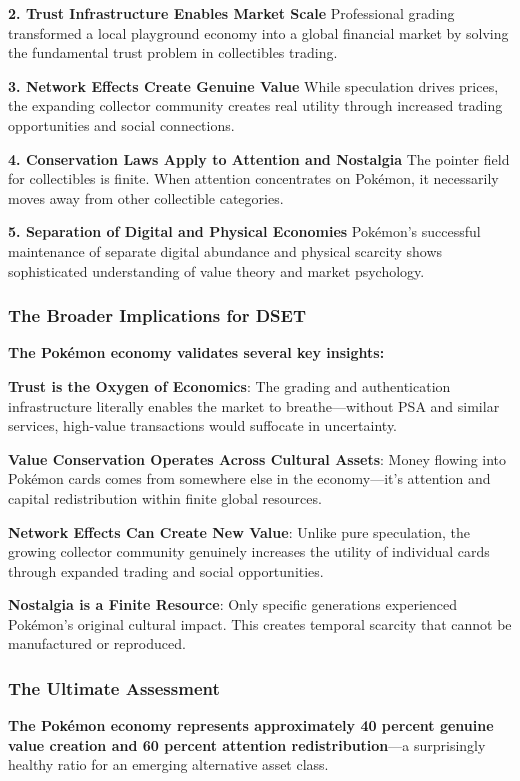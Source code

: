\documentclass[11pt,oneside]{book}
\begin{document}
{{{{{{\textbf{2. Trust Infrastructure Enables Market Scale}
Professional grading transformed a local playground economy into a global financial market by solving the fundamental trust problem in collectibles trading.

\textbf{3. Network Effects Create Genuine Value}
While speculation drives prices, the expanding collector community creates real utility through increased trading opportunities and social connections.

\textbf{4. Conservation Laws Apply to Attention and Nostalgia}
The pointer field for collectibles is finite. When attention concentrates on Pokémon, it necessarily moves away from other collectible categories.

\textbf{5. Separation of Digital and Physical Economies}
Pokémon's successful maintenance of separate digital abundance and physical scarcity shows sophisticated understanding of value theory and market psychology.

\subsubsection{The Broader Implications for DSET}

\textbf{The Pokémon economy validates several key insights:}

\textbf{Trust is the Oxygen of Economics}: The grading and authentication infrastructure literally enables the market to breathe—without PSA and similar services, high-value transactions would suffocate in uncertainty.

\textbf{Value Conservation Operates Across Cultural Assets}: Money flowing into Pokémon cards comes from somewhere else in the economy—it's attention and capital redistribution within finite global resources.

\textbf{Network Effects Can Create New Value}: Unlike pure speculation, the growing collector community genuinely increases the utility of individual cards through expanded trading and social opportunities.

\textbf{Nostalgia is a Finite Resource}: Only specific generations experienced Pokémon's original cultural impact. This creates temporal scarcity that cannot be manufactured or reproduced.

\subsubsection{The Ultimate Assessment}

\textbf{The Pokémon economy represents approximately 40 percent genuine value creation and 60 percent attention redistribution}—a surprisingly healthy ratio for an emerging alternative asset class.

}}}}}}
\end{document}
